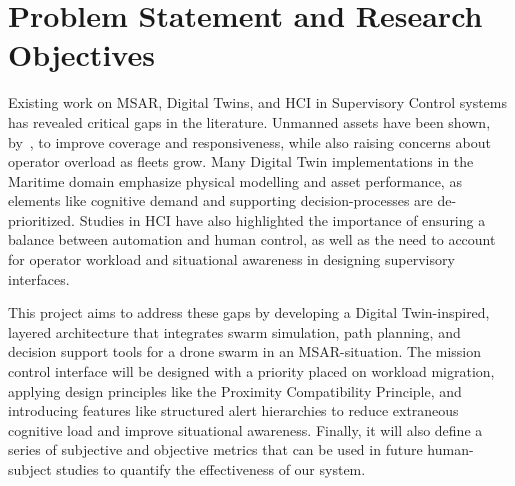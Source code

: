 \section{Problem Statement and Research Objectives}\label{sec:problem-statement-and-research-objectives}

Existing work on MSAR, Digital Twins, and HCI in Supervisory Control systems has revealed critical gaps in the literature.
Unmanned assets have been shown, by~\cite{7761074}, to improve coverage and responsiveness, while also raising concerns about operator overload as fleets grow.
Many Digital Twin implementations in the Maritime domain emphasize physical modelling and asset performance, as elements like cognitive demand and supporting decision-processes are de-prioritized.
Studies in HCI have also highlighted the importance of ensuring a balance between automation and human control, as well as the need to account for operator workload and situational awareness in designing supervisory interfaces.

This project aims to address these gaps by developing a Digital Twin-inspired, layered architecture that integrates swarm simulation, path planning, and decision support tools for a drone swarm in an MSAR-situation.
The mission control interface will be designed with a priority placed on workload migration, applying design principles like the Proximity Compatibility Principle, and introducing features like structured alert hierarchies to reduce extraneous cognitive load and improve situational awareness.
Finally, it will also define a series of subjective and objective metrics that can be used in future human-subject studies to quantify the effectiveness of our system.


